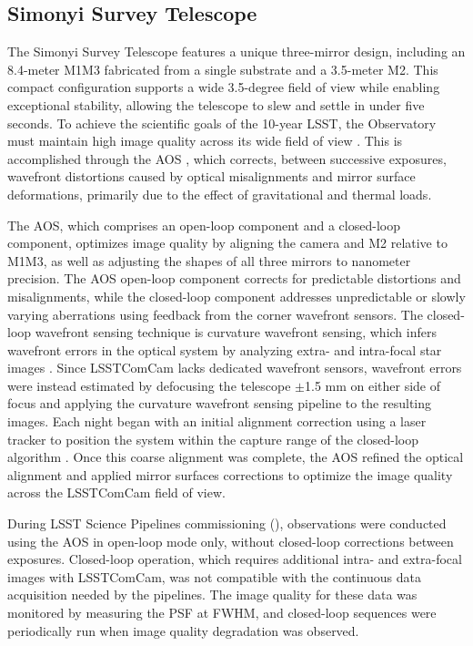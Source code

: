 \subsection{Simonyi Survey Telescope}
\label{ssec:simonyi}
The Simonyi Survey Telescope \citep{2024SPIE13094E..09S} features a unique three-mirror design, including an 8.4-meter \gls{M1M3} fabricated from a single substrate and a 3.5-meter \gls{M2}.
This compact \gls{configuration} supports a wide 3.5-degree field of view while enabling exceptional stability, allowing the telescope to slew and settle in under five seconds.
To achieve the scientific goals of the 10-year \gls{LSST}, the Observatory must maintain high image quality across its wide field of view \citep{2008arXiv0805.2366I}.
This is accomplished through the \gls{AOS} \citep{2015ApOpt..54.9045X,MegiasHomar_2024}, which corrects, between successive exposures, wavefront distortions caused by optical misalignments and mirror surface deformations, primarily due to the effect of gravitational and thermal loads.

The \gls{AOS}, which comprises an open-loop component and a closed-loop component, optimizes image quality by aligning the camera and \gls{M2} relative to \gls{M1M3}, as well as adjusting the shapes of all three mirrors to nanometer precision.
The \gls{AOS} open-loop component corrects for predictable distortions and misalignments, while the closed-loop component addresses unpredictable or slowly varying aberrations using feedback from the corner wavefront sensors.
The closed-loop wavefront sensing technique is curvature wavefront sensing, which infers wavefront errors in the optical system by analyzing extra- and intra-focal star images \citep{2023aoel.confE..67T}.
Since \gls{LSSTComCam} lacks dedicated wavefront sensors, wavefront errors were instead estimated by defocusing the telescope $\pm$1.5 mm on either side of focus and applying the curvature wavefront sensing pipeline to the resulting images.
Each night began with an initial alignment correction using a laser tracker to position the system within the capture range of the closed-loop \gls{algorithm} \citep{10.1117/12.3019031}.
Once this coarse alignment was complete, the \gls{AOS} refined the optical alignment and applied mirror surfaces corrections to optimize the image quality across the \gls{LSSTComCam} field of view.

During LSST \gls{Science Pipelines} commissioning (),  observations were conducted using the AOS in open-loop mode only, without closed-loop corrections between exposures. 
Closed-loop operation, which requires additional intra- and extra-focal images with LSSTComCam, was not compatible with the continuous data acquisition needed by the pipelines.
The image quality for these data was monitored by measuring the \gls{PSF} at \gls{FWHM}, and closed-loop sequences were periodically run when image quality degradation was observed.

